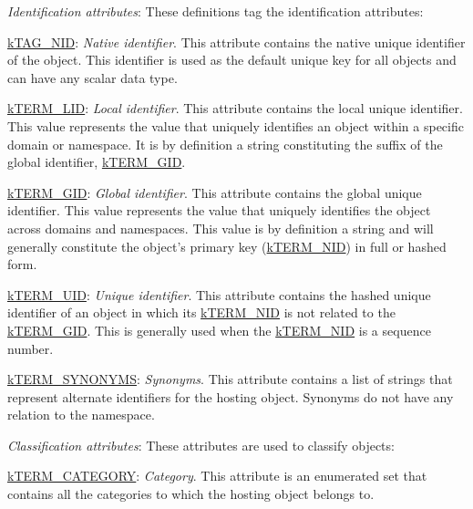 \begin{DoxyItemize}
\item {\itshape Identification attributes}\-: These definitions tag the identification attributes\-: 
\begin{DoxyItemize}
\item {\ttfamily \hyperlink{}{k\-T\-A\-G\-\_\-\-N\-I\-D}}\-: {\itshape Native identifier}. This attribute contains the native unique identifier of the object. This identifier is used as the default unique key for all objects and can have any scalar data type. 
\item {\ttfamily \hyperlink{}{k\-T\-E\-R\-M\-\_\-\-L\-I\-D}}\-: {\itshape Local identifier}. This attribute contains the local unique identifier. This value represents the value that uniquely identifies an object within a specific domain or namespace. It is by definition a string constituting the suffix of the global identifier, \hyperlink{}{k\-T\-E\-R\-M\-\_\-\-G\-I\-D}. 
\item {\ttfamily \hyperlink{}{k\-T\-E\-R\-M\-\_\-\-G\-I\-D}}\-: {\itshape Global identifier}. This attribute contains the global unique identifier. This value represents the value that uniquely identifies the object across domains and namespaces. This value is by definition a string and will generally constitute the object's primary key (\hyperlink{}{k\-T\-E\-R\-M\-\_\-\-N\-I\-D}) in full or hashed form. 
\item {\ttfamily \hyperlink{}{k\-T\-E\-R\-M\-\_\-\-U\-I\-D}}\-: {\itshape Unique identifier}. This attribute contains the hashed unique identifier of an object in which its \hyperlink{}{k\-T\-E\-R\-M\-\_\-\-N\-I\-D} is not related to the \hyperlink{}{k\-T\-E\-R\-M\-\_\-\-G\-I\-D}. This is generally used when the \hyperlink{}{k\-T\-E\-R\-M\-\_\-\-N\-I\-D} is a sequence number. 
\item {\ttfamily \hyperlink{}{k\-T\-E\-R\-M\-\_\-\-S\-Y\-N\-O\-N\-Y\-M\-S}}\-: {\itshape Synonyms}. This attribute contains a list of strings that represent alternate identifiers for the hosting object. Synonyms do not have any relation to the namespace. 
\end{DoxyItemize}
\item {\itshape Classification attributes}\-: These attributes are used to classify objects\-: 
\begin{DoxyItemize}
\item {\ttfamily \hyperlink{}{k\-T\-E\-R\-M\-\_\-\-C\-A\-T\-E\-G\-O\-R\-Y}}\-: {\itshape Category}. This attribute is an enumerated set that contains all the categories to which the hosting object belongs to. 

\end{DoxyItemize}
\end{DoxyItemize}
